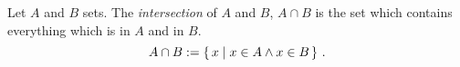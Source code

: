 \guard



\begin{defn}
\label{defn:intersection}
  Let $A$ and $B$ sets.
  The \emph{intersection} of $A$ and $B$, $A\cap B$ is the set which contains everything which is in $A$ and in $B$.
  \[ A\cap B := \left\{\, x \mid x\in A \wedge x\in B\,\right\}\,.\]
\end{defn}
